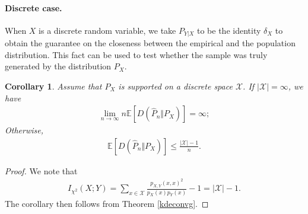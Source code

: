 \documentclass{article}
\numberwithin{equation}{section}
\newcommand{\E}{\mathbb{E}}
\renewcommand{\cal}{\mathcal}
\newcommand{\wh}{\widehat}
\theoremstyle{plain}
\newtheorem{corollary}[theorem]{Corollary}
\theoremstyle{definition}
\begin{document}
\paragraph{Discrete case.} When $X$ is a discrete random variable, we take $P_{Y|X}$ to be the identity $\delta_X$ to obtain the guarantee on the closeness between the empirical and the population distribution. This fact can
be used to test whether the sample was truly generated by the distribution $P_X$.
\begin{corollary}
Assume that $P_X$ is supported on a discrete space $\cal{X}$. If $\vert\cal{X}\vert=\infty$, we have
\begin{align*}
	\lim_{n\to\infty} n\E\left[D(\wh{P}_n\Vert P_X)\right]=\infty;
\end{align*}
Otherwise,
\begin{align*}
	\E\left[D(\wh{P}_n\Vert P_X)\right]\leq\frac{\vert\cal{X}\vert-1}{n}.
\end{align*}
\end{corollary}
\begin{proof}
We note that
\begin{align*}
	I_{\chi^2}(X;Y)=\sum_{x\in\cal{X}}\frac{p_{X,Y}(x,x)^2}{p_X(x)p_Y(x)}-1=\vert\cal{X}\vert-1.
\end{align*}
The corollary then follows from Theorem \ref{kdeconvg}.
\end{proof}
\end{document}
